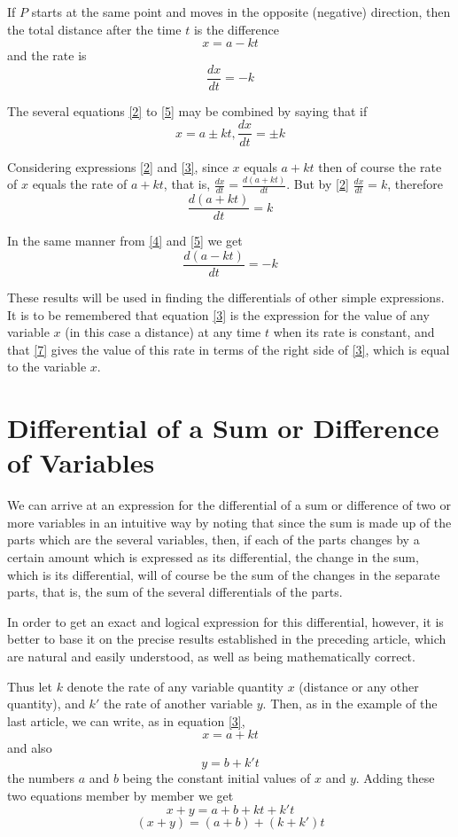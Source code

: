 If $P$ starts at the same point and moves in the opposite (negative) direction, then the total distance after the time $t$ is the difference
\[x = a - kt \tag{4} \label{4}\]
and the rate is
\[\frac{dx}{dt} = -k \tag{5} \label{5}\]

The several equations \eqref{2} to \eqref{5} may be combined by saying that if
\[x = a \pm kt, \frac{dx}{dt} = \pm k \tag{6} \label{6}\]

Considering expressions \eqref{2} and \eqref{3}, since $x$ equals $a + kt$ then of course the rate of $x$ equals the rate of $a + kt$, that is, $\frac{dx}{dt} = \frac{d(a+kt)}{dt}$. But by \eqref{2} $\frac{dx}{dt} = k$, therefore
\[\frac{d(a+kt)}{dt} = k \tag{7} \label{7}\]

In the same manner from \eqref{4} and \eqref{5} we get
\[\frac{d(a-kt)}{dt} = -k\]

These results will be used in finding the differentials of other simple expressions. It is to be remembered that equation \eqref{3} is the expression for the value of any variable $x$ (in this case a distance) at any time $t$ when its rate is constant, and that \eqref{7} gives the value of this rate in terms of the right side of \eqref{3}, which is equal to the variable $x$.

\section{Differential of a Sum or Difference of Variables}
We can arrive at an expression for the differential of a sum or difference of two or more variables in an intuitive way by noting that since the sum is made up of the parts which are the several variables, then, if each of the parts changes by a certain amount which is expressed as its differential, the change in the sum, which is its differential, will of course be the sum of the changes in the separate parts, that is, the sum of the several differentials of the parts.

In order to get an exact and logical expression for this differential, however, it is better to base it on the precise results established in the preceding article, which are natural and easily understood, as well as being mathematically correct.

Thus let $k$ denote the rate of any variable quantity $x$ (distance or any other quantity), and $k'$ the rate of another variable $y$. Then, as in the example of the last article, we can write, as in equation \eqref{3},
\[x = a + kt \]
and also
\[y = b + k't\]
the numbers $a$ and $b$ being the constant initial values of $x$ and $y$. Adding these two equations member by member we get
\[x + y = a + b + kt + k't\]
\[(x + y) = (a + b) + (k + k')t\]


